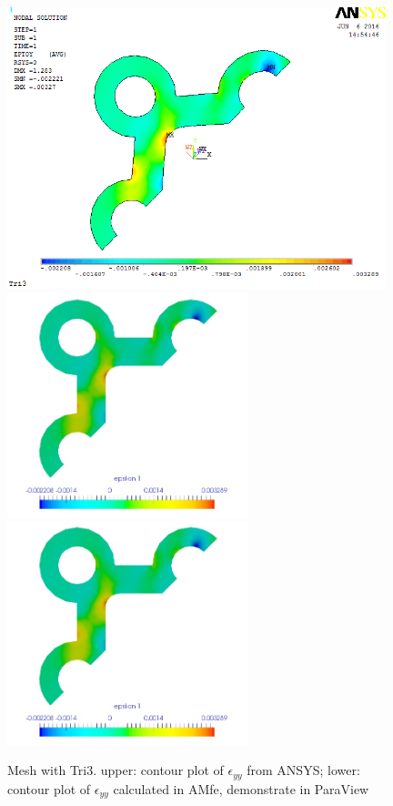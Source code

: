 \begin{figure}[htbp]
	\begin{center}
		\includegraphics[width=11cm,clip]{TTri3_Eyy.png} 	
		\includegraphics[width=7cm,clip]{TTri3_Eyy_PD.png} 	
		\includegraphics[width=7cm,clip]{TTri3_Eyy_P.png} 		
		\caption{Mesh with Tri3. upper: contour plot of $\epsilon_{yy}$ from ANSYS; lower: contour plot of $\epsilon_{yy}$ calculated in AMfe, demonstrate in ParaView} \label{fig: Tri3_Eyy}
	\end{center}
\end{figure}
\clearpage 

